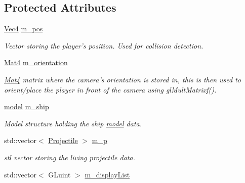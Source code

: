 \subsection*{Protected Attributes}
\begin{DoxyCompactItemize}
\item 
\hypertarget{classPlayer_a9148215aedbac532a127fdcc95ec10c0}{
\hyperlink{classVec4}{Vec4} \hyperlink{classPlayer_a9148215aedbac532a127fdcc95ec10c0}{m\_\-pos}}
\label{classPlayer_a9148215aedbac532a127fdcc95ec10c0}

\begin{DoxyCompactList}\small\item\em Vector storing the player's position. Used for collision detection. \item\end{DoxyCompactList}\item 
\hypertarget{classPlayer_a7f636385efde8613a2bd2b78a7cc873e}{
\hyperlink{classMat4}{Mat4} \hyperlink{classPlayer_a7f636385efde8613a2bd2b78a7cc873e}{m\_\-orientation}}
\label{classPlayer_a7f636385efde8613a2bd2b78a7cc873e}

\begin{DoxyCompactList}\small\item\em \hyperlink{classMat4}{Mat4} matrix where the camera's orientation is stored in, this is then used to orient/place the player in front of the camera using glMultMatrixf(). \item\end{DoxyCompactList}\item 
\hypertarget{classPlayer_adec0bc4700f53ed43ae83c6effe8a506}{
\hyperlink{structmodel}{model} \hyperlink{classPlayer_adec0bc4700f53ed43ae83c6effe8a506}{m\_\-ship}}
\label{classPlayer_adec0bc4700f53ed43ae83c6effe8a506}

\begin{DoxyCompactList}\small\item\em Model structure holding the ship \hyperlink{structmodel}{model} data. \item\end{DoxyCompactList}\item 
\hypertarget{classPlayer_aee062ad31b2cd1d5b513388e684776b4}{
std::vector$<$ \hyperlink{classProjectile}{Projectile} $>$ \hyperlink{classPlayer_aee062ad31b2cd1d5b513388e684776b4}{m\_\-p}}
\label{classPlayer_aee062ad31b2cd1d5b513388e684776b4}

\begin{DoxyCompactList}\small\item\em stl vector storing the living projectile data. \item\end{DoxyCompactList}\item 
\hypertarget{classPlayer_a37bf1b59ec223a8acb7cac90f30cb281}{
std::vector$<$ GLuint $>$ \hyperlink{classPlayer_a37bf1b59ec223a8acb7cac90f30cb281}{m\_\-displayList}}
\label{classPlayer_a37bf1b59ec223a8acb7cac90f30cb281}


\end{DoxyCompactItemize}
